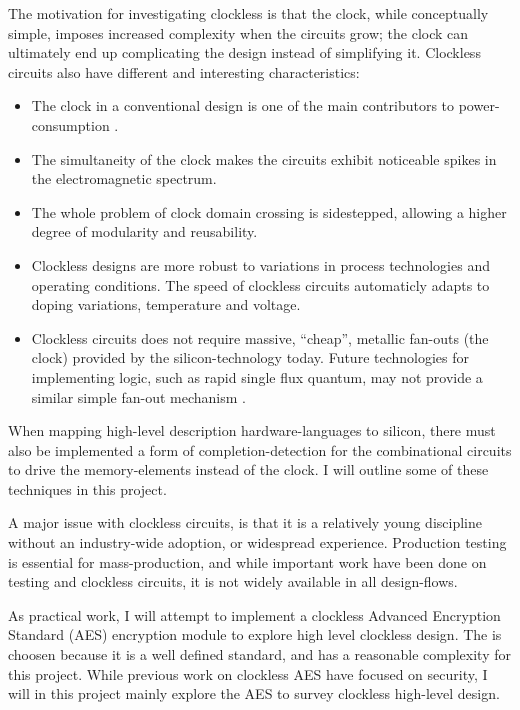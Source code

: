 The motivation for investigating clockless is that the clock, while
conceptually simple, imposes increased complexity when the circuits
grow; the clock can ultimately end up complicating the design instead
of simplifying it. Clockless circuits also have different and
interesting characteristics: 
\begin{itemize}

\item The clock in a conventional design is one of the main
  contributors to power-consumption \cite{tiwari1998reducing}.

\item The simultaneity of the clock makes the circuits exhibit
  noticeable spikes in the electromagnetic spectrum.

\item The whole problem of clock domain crossing is sidestepped,
  allowing a higher degree of modularity and reusability.

\item Clockless designs are more robust to variations in process
  technologies and operating conditions. The speed of clockless
  circuits automaticly adapts to doping variations, temperature and
  voltage.

\item Clockless circuits does not require massive, ``cheap'', metallic
  fan-outs (the clock) provided by the silicon-technology today. Future
  technologies for implementing logic, such as rapid single flux
  quantum, may not provide a similar simple fan-out mechanism \cite{rapid}.
\end{itemize}

When mapping high-level description hardware-languages to silicon,
there must also be implemented a form of completion-detection for the
combinational circuits to drive the memory-elements instead of the
clock. I will outline some of these techniques in this project.

A major issue with clockless circuits, is that it is a relatively
young discipline without an industry-wide adoption, or widespread
experience. Production testing is essential for mass-production, and
while important work have been done on testing and clockless
circuits\cite{fullscan}, it is not widely available in all
design-flows.

As practical work, I will attempt to implement a clockless Advanced
Encryption Standard (AES)\cite{rijandael} encryption module to explore
high level clockless design. The is choosen because it is a well
defined standard, and has a reasonable complexity for this
project. While previous work on clockless AES\cite{claes} have focused
on security, I will in this project mainly explore the AES to survey
clockless high-level design.

